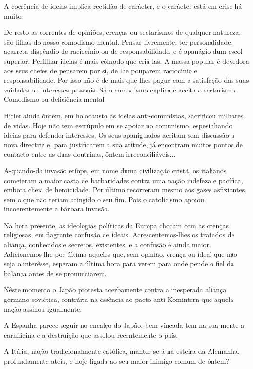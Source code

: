\documentclass[9pt]{article}
\begin{document}
A coerência de ideias implica rectidão de carácter, e o carácter está
em crise há muito.

De-resto as correntes de opiniões, crenças ou sectarismos de qualquer
natureza, são fi\-lhas do nosso comodismo mental. Pensar livremente, ter personalidade, acarreta dispêndio de raciocínio ou de responsabilidade, e é apanágio dum escol superior. Perfi\-lhar ideias é mais cómodo que criá-las.
A massa popular é devedora aos seus chefes de
pensarem por si, de lhe pouparem raciocínio e responsabilidade. Por isso
não é de mais que lhes pague com a satisfa\-ção das suas vaidades ou interesses pessoais. Só o comodismo explica e aceita o sectarismo. Comodismo ou
deficiência mental.

Hitler ainda ôntem, em holocausto às ideias anti-comunistas, sacrificou
mi\-lhares de vidas. Hoje não tem escrúpulo em se apoiar no comunismo, espesinhando ideias para defender interesses. Os seus apaniguados aceitam sem
discussão a nova directriz e, para justifi\-carem a sua atitude, já encontram
muitos pontos de contacto entre as duas doutrinas, ôntem irreconciliáveis...

A-quan\-do-da invasão etíope, em nome duma civiliza\-ção cristã, os italianos cometeram a maior casta de barbaridades contra uma na\-ção indefeza e
pacífi\-ca, embora cheia de heroicidade. Por último recorreram mesmo aos gases
asfixiantes, sem o que não teriam atingido o seu fim. Pois o catolicismo
apoiou incoerentemente a bárbara invasão.

Na hora presente, as ideologias políticas da Europa chocam com as crenças religiosas, em flagrante confusão de ideais. Acrescentemos-\-lhes os tratados de alian\-ça, conhecidos e secretos, existentes, e a confusão é ainda maior.
Adicionemos-\-lhe por último aqueles que, sem opinião, crença ou ideal que não
seja o interêsse, esperam a última hora para verem para onde pende o fiel da
balan\-ça antes de se pronunciarem.

Nêste momento o Japão protesta acerbamente contra a inesperada alian\-ça
germano-soviética, contrária na essência ao pacto anti-Komin\-tern que aquela
na\-ção assinou igualmente.

A Espanha parece seguir no encalço do Japão, bem vincada tem na sua
mente a carnificina e a destrui\-ção que assolou recentemente o país.

A Itália, na\-ção tradicionalmente católica, manter-se-á na esteira da
Alemanha, profundamente ateia, e hoje ligada ao seu maior inimigo comum de
ôntem?
\end{document}
